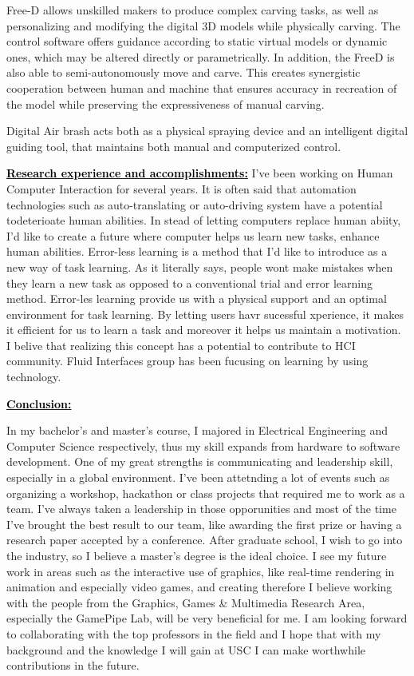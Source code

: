 \documentclass{article}
\newcommand{\statement}[1]{\par\medskip
  \underline{\textcolor{black}{\textbf{#1:}}}\space
}
\begin{document}
Free-D allows unskilled makers to produce complex carving tasks, as well as personalizing and modifying the digital 3D models while physically carving. The control software offers guidance according to static virtual models or dynamic ones, which may be altered directly or parametrically. In addition, the FreeD is also able to semi-autonomously move and carve. This creates synergistic cooperation between human and machine that ensures accuracy in recreation of the model while preserving the expressiveness of manual carving. 

Digital Air brash acts both as a physical spraying device and an intelligent digital guiding tool, that maintains both manual and computerized control.


\statement{Research experience and accomplishments}I've been working on Human Computer Interaction for several years. It is often said that automation technologies such as auto-translating or auto-driving  system have a potential todeterioate human abilities. In stead of letting computers replace human abiity, I'd like to create a future where computer helps us learn new tasks, enhance human abilities. Error-less learning is a method that I'd like to introduce as a new way of task learning. As it literally says, people wont make mistakes when they learn a new task as opposed to a conventional trial and error learning method. Error-les learning provide us with a physical support and an optimal environment for task learning. By letting users havr sucessful xperience, it makes it efficient for us to learn a task and moreover it helps us maintain a motivation. I belive that realizing this concept  has a potential to contribute to HCI community. Fluid Interfaces group has been fucusing on learning by using technology. 

\statement{Conclusion}
In my bachelor's and master's course, I majored in Electrical Engineering and Computer Science respectively,  thus my skill expands from hardware to software development.
One of my great strengths is communicating and leadership skill, especially in a global environment. I've been attetnding a lot of events such as organizing a workshop, hackathon or class projects that required me to work as a team. I've always taken a leadership in those opporunities and most of the time I've brought the best result to our team, like awarding the first prize or having a research paper accepted by a conference. 
After graduate school, I wish to go into the industry, so I believe a master’s degree is the ideal choice. I see my future work in areas such as the interactive use of graphics, like real-time rendering in animation and especially video games, and creating therefore I believe working with the people from the Graphics, Games & Multimedia Research Area, especially the GamePipe Lab, will be very beneficial for me. I am looking forward to collaborating with the top professors in the field and I hope that with my background and the knowledge I will gain at USC I can make worthwhile contributions in the future.
\end{document}
